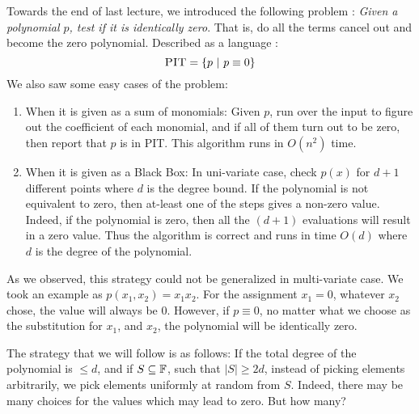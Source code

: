 
Towards the end of last lecture, we introduced the following problem :
{\em Given a polynomial $p$, test if it is identically zero}. That is,
do all the terms cancel out and become the zero polynomial. Described
as a language :
$$\textrm{\sc PIT}=\{ p ~|~p \equiv 0\}$$
We also saw some easy cases of the problem:
\begin{enumerate}
\item When it is given as a sum of monomials: Given $p$, run over the
  input to figure out the coefficient of each monomial, and if all of
  them turn out to be zero, then report that $p$ is in {\sc PIT}. This
  algorithm runs in $O(n^2)$ time.
\item When it is given as a Black Box: In uni-variate case, check
  $p(x)$ for $d+1$ different points where $d$ is the degree bound. If
  the polynomial is not equivalent to zero, then at-least one of the
  steps gives a non-zero value. Indeed, if the polynomial is zero,
  then all the $(d+1)$ evaluations will result in a zero value. Thus
  the algorithm is correct and runs in time $O(d)$ where $d$ is the
  degree of the polynomial.
\end{enumerate}

As we observed, this strategy could not be generalized in
multi-variate case. We took an example as $p(x_1,x_2) = x_1x_2$. For
the assignment $x_1=0$, whatever $x_2$ chose, the value will always be
0. However, if $p \equiv 0$, no matter what we choose as the
substitution for $x_1$, and $x_2$, the polynomial will be identically
zero.

The strategy that we will follow is as follows: If the total degree of
the polynomial is $\leq d$, and if $S \subseteq {\mathbb{F}}$, such that
$|S|\geq 2d$, instead of picking elements arbitrarily, we pick
elements uniformly at random from $S$. Indeed, there may be many
choices for the values which may lead to zero. But how many?

